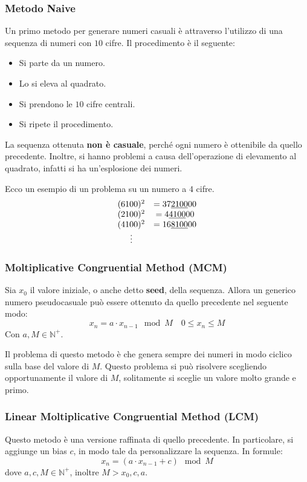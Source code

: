 \subsubsection{Metodo Naive}
Un primo metodo per generare numeri casuali è attraverso l'utilizzo di una sequenza
di numeri con $10$ cifre. Il procedimento è il seguente:
\begin{itemize}
    \item Si parte da un numero.
    \item Lo si eleva al quadrato.
    \item Si prendono le $10$ cifre centrali.
    \item Si ripete il procedimento.
\end{itemize}
La sequenza ottenuta \textbf{non è casuale}, perché ogni numero è ottenibile da
quello precedente. Inoltre, si hanno problemi a causa dell'operazione di elevamento
al quadrato, infatti si ha un'esplosione dei numeri.
\begin{esempio}
    Ecco un esempio di un problema su un numero a $4$ cifre.
    \begin{equation*}
        \begin{array}[pos]{cc}
            (6100)^2 & = 37\underline{2100}00 \\
            (2100)^2 & = 4\underline{4100}00  \\
            (4100)^2 & = 16\underline{8100}00 \\
            \vdots
        \end{array}
    \end{equation*}
\end{esempio}
\subsubsection{Moltiplicative Congruential Method (MCM)}
Sia $x_0$ il valore iniziale, o anche detto \textbf{seed}, della sequenza. Allora
un generico numero pseudocasuale può essere ottenuto da quello precedente nel
seguente modo:
\begin{equation}
    x_n = a \cdot x_{n-1} \mod M \quad 0 \leq x_n \leq M
\end{equation}
Con $a, M \in \mathbb{N}^+$.

Il problema di questo metodo è che genera sempre dei numeri in modo ciclico sulla
base del valore di $M$. Questo problema si può risolvere scegliendo opportunamente
il valore di $M$, solitamente si sceglie un valore molto grande e primo.
\subsubsection{Linear Moltiplicative Congruential Method (LCM)}
Questo metodo è una versione raffinata di quello precedente. In particolare, si
aggiunge un bias $c$, in modo tale da personalizzare la sequenza. In formule:
\begin{equation}
    x_n = (a \cdot x_{n-1} + c) \mod M
\end{equation}
dove $a,c,M \in \mathbb{N}^+$, inoltre $M > x_0, c, a$.

